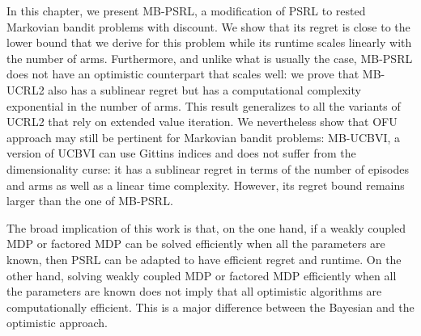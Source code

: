 In this chapter, we present MB-PSRL, a modification of PSRL to rested Markovian bandit problems with discount. We show that its regret is close to the lower bound that we derive for this problem while its runtime scales linearly with the number of arms. Furthermore, and unlike what is usually the case, MB-PSRL does not have an optimistic counterpart that scales well: we prove that  MB-UCRL2 also has a sublinear regret but has a computational complexity exponential in the number of arms. This result generalizes to all  the variants of UCRL2 that rely on extended value iteration. We nevertheless show that OFU approach may still be pertinent for Markovian bandit problems:  MB-UCBVI, a version of UCBVI can use Gittins indices and  does not suffer from the dimensionality curse: it has a sublinear regret in terms of the number of episodes and arms as well as a linear time complexity. However, its regret bound remains larger than the one of MB-PSRL.

The broad implication of this work is that, on the one hand, if a weakly coupled MDP or factored MDP can be solved efficiently when all the parameters are known, then PSRL can be adapted to have efficient regret and runtime. On the other hand, solving weakly coupled MDP or factored MDP efficiently when all the parameters are known does not imply that all optimistic algorithms are computationally efficient. This is a major difference between the Bayesian and the optimistic approach.

\newpage

